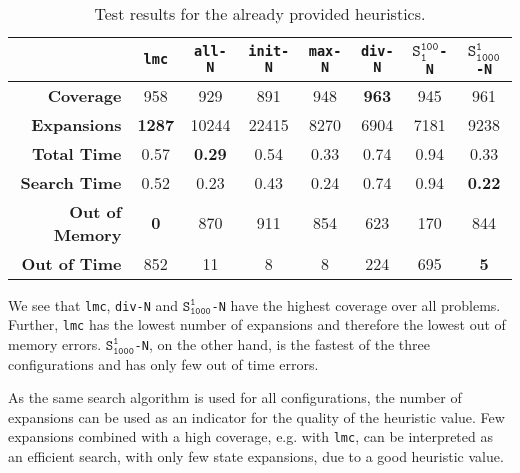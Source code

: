 \begin{table}[h!]
    \begin{center}
        \begin{tabular}{|r|c|c|c|c|c|c|c|}
            \hline
            & \textbf{\texttt{lmc}} & \textbf{\texttt{all-N}} & \textbf{\texttt{init-N}} & \textbf{\texttt{max-N}} & \textbf{\texttt{div-N}} & \textbf{$\texttt{S}_\texttt{1}^\texttt{100}$\texttt{-N}} & \textbf{$\texttt{S}_\texttt{1000}^\texttt{1}$\texttt{-N}} \\
            \hline \hline
            \textbf{Coverage}       & 958           & 929           & 891   & 948   & \textbf{963}  & 945   & 961   \\ \hline
            \textbf{Expansions}     & \textbf{1287} & 10244         & 22415 & 8270  & 6904          & 7181  & 9238  \\ \hline
            \textbf{Total Time}     & 0.57          & \textbf{0.29} & 0.54  & 0.33  & 0.74          & 0.94  & 0.33  \\ \hline
            \textbf{Search Time}    & 0.52          & 0.23          & 0.43  & 0.24  & 0.74          & 0.94  & \textbf{0.22}  \\ \hline
            \textbf{Out of Memory}  & \textbf{0}    & 870           & 911   & 854   & 623           & 170   & 844   \\ \hline
            \textbf{Out of Time}    & 852           & 11            & 8     & 8     & 224           & 695   & \textbf{5}     \\ \hline
        \end{tabular}
        \caption{Test results for the already provided heuristics.}
        \label{table:standard_heuristics}
    \end{center}
\end{table}

We see that \texttt{lmc}, \texttt{div-N} and $\texttt{S}_\texttt{1000}^\texttt{1}$\texttt{-N} have the highest coverage over all problems.
Further, \texttt{lmc} has the lowest number of expansions and therefore the lowest out of memory errors.
$\texttt{S}_\texttt{1000}^\texttt{1}$\texttt{-N}, on the other hand, is the fastest of the three configurations and has only few out of time errors.

As the same search algorithm is used for all configurations, the number of expansions can be used as an indicator for the quality of the heuristic value.
Few expansions combined with a high coverage, e.g. with \texttt{lmc}, can be interpreted as an efficient search, with only few state expansions, due to a good heuristic value.

